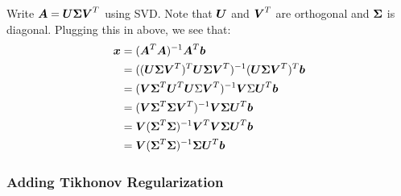 Write $\bd{A}=\bd{U}\bd{\Sigma}\bd{V}^T$ using SVD. Note that $\bd{U}$ and $\bd{V}^T$ are orthogonal and $\bd{\Sigma}$ is diagonal. Plugging this in above, we see that:
\begin{align*}
    \bd{x}&=(\bd{A}^T\bd{A})^{-1}\bd{A}^T\bd{b}\\
    &=((\bd{U}\bd{\Sigma}\bd{V}^T)^T\bd{U}\bd{\Sigma}\bd{V}^T)^{-1}(\bd{U}\bd{\Sigma}\bd{V}^T)^T\bd{b}\\
    &=(\bd{V}\bd{\Sigma}^T\bd{U}^T\bd{U}\Sigma\bd{V}^T)^{-1}\bd{V}\Sigma\bd{U}^T\bd{b}\\
    &=(\bd{V}\bd{\Sigma}^T\bd{\Sigma}\bd{V}^T)^{-1}\bd{V}\bd{\Sigma}\bd{U}^T\bd{b}\\
    &=\bd{V}(\bd{\Sigma}^T\bd{\Sigma})^{-1}\bd{V}^T\bd{V}\bd{\Sigma}\bd{U}^T\bd{b}\\
    &=\bd{V}(\bd{\Sigma}^T\bd{\Sigma})^{-1}\bd{\Sigma}\bd{U}^T\bd{b}
\end{align*}

\subsubsection{Adding Tikhonov Regularization}\label{subsubsec:tikhonovregsol}

